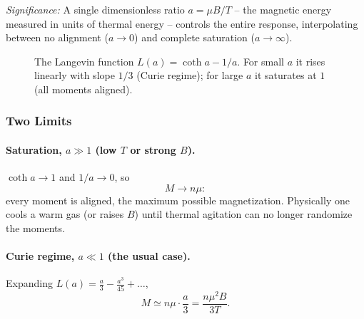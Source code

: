 \textit{Significance:} A single dimensionless ratio $a=\mu B/T$ -- the magnetic energy
measured in units of thermal energy -- controls the entire response, interpolating between
no alignment ($a\to0$) and complete saturation ($a\to\infty$).

\begin{figure}[h]
\centering
{}
\caption{The Langevin function $L(a)=\coth a-1/a$. For small $a$ it rises linearly with
slope $1/3$ (Curie regime); for large $a$ it saturates at $1$ (all moments aligned).}
\label{fig:lec19-langevin}
\end{figure}

\subsubsection*{Two Limits}
\paragraph{Saturation, $a\gg1$ (low $T$ or strong $B$).}
$\coth a\to1$ and $1/a\to0$, so
\begin{equation}\label{eq:lec19-sat}
  M\to n\mu :
\end{equation}
every moment is aligned, the maximum possible magnetization. Physically one cools a warm
gas (or raises $B$) until thermal agitation can no longer randomize the moments.

\paragraph{Curie regime, $a\ll1$ (the usual case).}
Expanding $L(a)=\tfrac{a}{3}-\tfrac{a^3}{45}+\dots$,
\begin{equation}\label{eq:lec19-curie-M}
  M\simeq n\mu\cdot\frac{a}{3}=\frac{n\mu^2 B}{3T}.
\end{equation}

